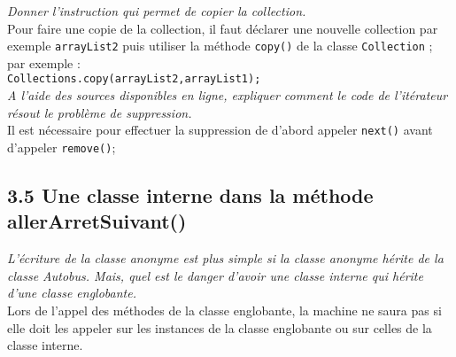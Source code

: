 \documentclass{article}
\begin{document}
\noindent \emph{Donner l’instruction qui permet de copier la collection.}\\
Pour faire une copie de la collection, il faut déclarer une nouvelle collection par exemple \texttt{arrayList2} puis utiliser la méthode \texttt{copy()} de la classe \texttt{Collection} ; par exemple :\\
\texttt{Collections.copy(arrayList2,arrayList1);}\\

\noindent \emph{A l’aide des sources disponibles en ligne, expliquer comment le code de l’itérateur résout le problème de suppression.}\\
Il est nécessaire pour effectuer la suppression de d'abord appeler \texttt{next()} avant d'appeler \texttt{remove()};

\subsection*{3.5  Une classe interne dans la méthode allerArretSuivant()}

\noindent \emph{L’écriture de la classe anonyme est plus simple si la classe anonyme hérite de la classe Autobus. Mais, quel est le danger d’avoir une classe interne qui hérite d’une classe englobante.}\\

Lors de l'appel des méthodes de la classe englobante, la machine ne saura pas si elle doit les appeler sur les instances de la classe englobante ou sur celles de la classe interne. 
\end{document}
